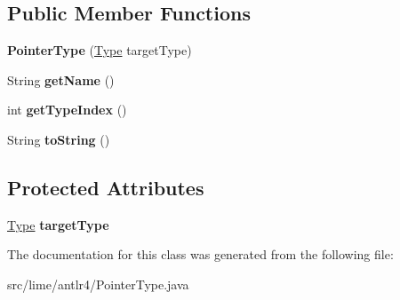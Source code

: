 \subsection*{Public Member Functions}
\begin{DoxyCompactItemize}
\item 
\mbox{\label{classlime_1_1antlr4_1_1PointerType_a1cc426f8d589e506f4b4b23a20e96cf9}} 
{\bfseries Pointer\+Type} (\hyperlink{interfacelime_1_1antlr4_1_1Type}{Type} target\+Type)
\item 
\mbox{\label{classlime_1_1antlr4_1_1PointerType_ad3473dffd49cc3270fbf81d752949647}} 
String {\bfseries get\+Name} ()
\item 
\mbox{\label{classlime_1_1antlr4_1_1PointerType_a5cea4480b1ed7e29003304d8f5be87a0}} 
int {\bfseries get\+Type\+Index} ()
\item 
\mbox{\label{classlime_1_1antlr4_1_1PointerType_aaee793b566aa57a5f96f18db0c8d73a0}} 
String {\bfseries to\+String} ()
\end{DoxyCompactItemize}
\subsection*{Protected Attributes}
\begin{DoxyCompactItemize}
\item 
\mbox{\label{classlime_1_1antlr4_1_1PointerType_a5f043fdd0c4e4eea5880a754abda958c}} 
\hyperlink{interfacelime_1_1antlr4_1_1Type}{Type} {\bfseries target\+Type}
\end{DoxyCompactItemize}


The documentation for this class was generated from the following file\+:\begin{DoxyCompactItemize}
\item 
src/lime/antlr4/Pointer\+Type.\+java\end{DoxyCompactItemize}

